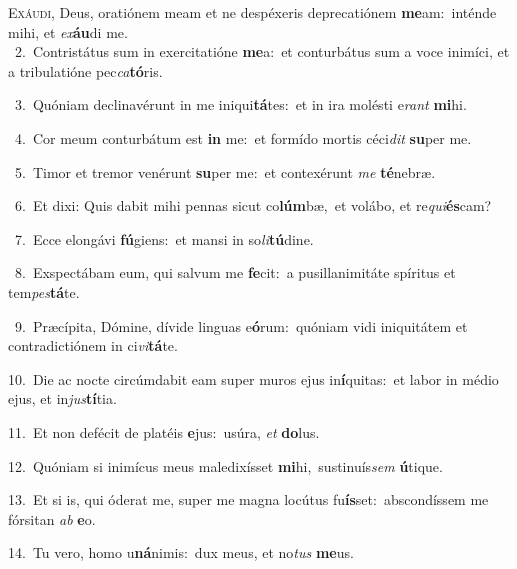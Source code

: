 \lettrine{\initial\textcolor{\initialcolor}{E}}{xáudi,} Deus, oratiónem meam et ne despéxeris deprecatiónem \textbf{me}\-am:~\star inténde mihi, et \textit{ex}\-\textbf{áu}di me.\\
{\numbfont\textcolor{\numbcolor}{~2.}}~Contristátus sum in exercitatióne \textbf{me}\-a:~\star et conturbátus sum a voce inimíci, et a tribulatióne pec\-\textit{ca}\-\textbf{tó}ris.\par
{\numbfont\textcolor{\numbcolor}{~3.}}~Quóniam declinavérunt in me iniqui\-\textbf{tá}\-tes:~\star et in ira molésti e\textit{rant} \textbf{mi}\-hi.\par
{\numbfont\textcolor{\numbcolor}{~4.}}~Cor meum conturbátum est \textbf{in} me:~\star et formído mortis céci\textit{dit} \textbf{su}\-per me.\par
{\numbfont\textcolor{\numbcolor}{~5.}}~Timor et tremor venérunt \textbf{su}\-per me:~\star et contexérunt \textit{me} \textbf{té}\-nebræ.\par
{\numbfont\textcolor{\numbcolor}{~6.}}~Et dixi: Quis dabit mihi pennas sicut co\-\textbf{lúm}\-bæ,~\star et volábo, et re\-\textit{qui}\-\textbf{és}cam?\par
{\numbfont\textcolor{\numbcolor}{~7.}}~Ecce elongávi \textbf{fú}\-giens:~\star et mansi in so\-\textit{li}\-\textbf{tú}dine.\par
{\numbfont\textcolor{\numbcolor}{~8.}}~Exspectábam eum, qui salvum me \textbf{fe}\-cit:~\star a pusillanimitáte spíritus et tem\-\textit{pes}\-\textbf{tá}te.\par
{\numbfont\textcolor{\numbcolor}{~9.}}~Præcípita, Dómine, dívide linguas e\-\textbf{ó}\-rum:~\star quóniam vidi iniquitátem et contradictiónem in ci\-\textit{vi}\-\textbf{tá}te.\par
{\numbfont\textcolor{\numbcolor}{10.}}~Die ac nocte circúmdabit eam super muros ejus in\-\textbf{í}\-quitas:~\star et labor in médio ejus, et in\-\textit{jus}\-\textbf{tí}tia.\par
{\numbfont\textcolor{\numbcolor}{11.}}~Et non defécit de platéis \textbf{e}\-jus:~\star usúra, \textit{et} \textbf{do}\-lus.\par
{\numbfont\textcolor{\numbcolor}{12.}}~Quóniam si inimícus meus maledixísset \textbf{mi}\-hi,~\star sustinuís\textit{sem} \textbf{ú}\-tique.\par
{\numbfont\textcolor{\numbcolor}{13.}}~Et si is, qui óderat me, super me magna locútus fu\-\textbf{ís}\-set:~\star abscondíssem me fórsitan \textit{ab} \textbf{e}\-o.\par
{\numbfont\textcolor{\numbcolor}{14.}}~Tu vero, homo u\-\textbf{ná}\-nimis:~\star dux meus, et no\textit{tus} \textbf{me}\-us.\par
